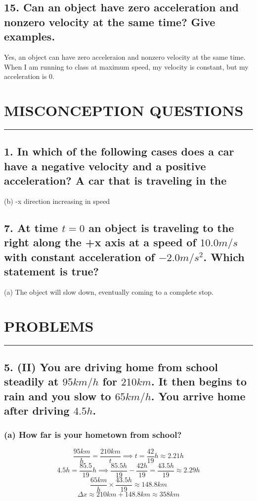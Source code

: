 \documentclass[12pt,a4paper,english]{article}
\begin{document}
\begin{flushleft}
      \subsection{15. Can an object have zero acceleration and nonzero velocity at the same time? Give examples.}
      Yes, an object can have zero acceleraion and nonzero velocity at the same time. When I am running to class at maximum speed, my velocity is constant, but my acceleration is 0.
    \section*{MISCONCEPTION QUESTIONS}
      \hrule
      \subsection{1. In which of the following cases does a car have a negative velocity and a positive acceleration? A car that is traveling in the}
      (b) -x direction increasing in speed
      \subsection{7. At time $t = 0$ an object is traveling to the right along the +x axis at a speed of $10.0m/s$ with constant acceleration of $-2.0m/s^2$. Which statement is true?}
      (a) The object will slow down, eventually coming to a complete stop.
    \section{PROBLEMS}
      \hrule
      \subsection{5. (II) You are driving home from school steadily at $95 km/h$ for $210 km$. It then begins to rain and you slow to $65 km/h$. You arrive home after driving $4.5 h$.}
        \subsubsection{(a) How far is your hometown from school?}
        \[
          \frac{95km}{h} = \frac{210km}{t} \implies 
          t=\frac{42}{19}h \approx 2.21h
        \]
        \[
          4.5h=\frac{85.5}{19}h \implies 
          \frac{85.5h}{19}-\frac{42h}{19} =\frac{43.5h}{19}\approx2.29h
        \]
        \[ 
          \frac{65km}{h} \times \frac{43.5h}{19} \approx 148.8km
        \]
          \[
            \Delta x\approx210km+148.8km\approx358km
          \]

\end{flushleft}
\end{document}
